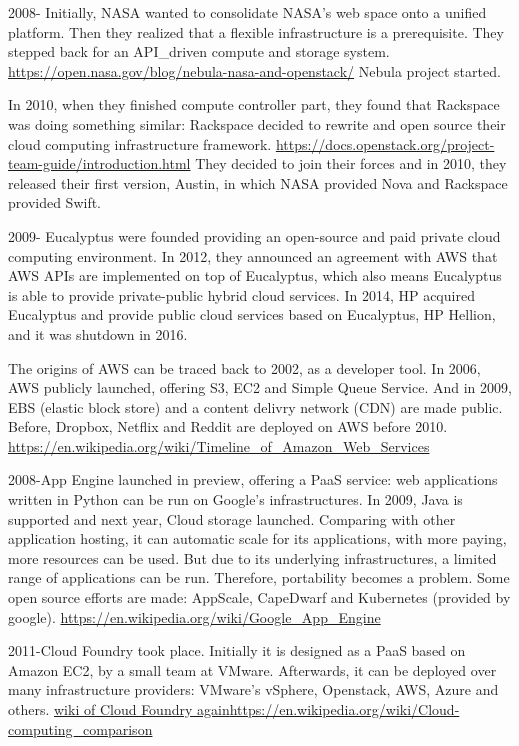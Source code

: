 \documentclass[a4paper,12pt]{article}
\begin{document}
2008- Initially, NASA wanted to consolidate NASA’s web space onto a unified platform. Then they realized that a flexible infrastructure is a prerequisite. They stepped back for an API\_driven compute and storage system. \url{https://open.nasa.gov/blog/nebula-nasa-and-openstack/} Nebula project started. 

In 2010, when they finished compute controller part, they found that Rackspace was doing something similar: Rackspace decided to rewrite and open source their cloud computing infrastructure framework. \url{https://docs.openstack.org/project-team-guide/introduction.html} They decided to join their forces and in 2010, they released their first version, Austin, in which NASA provided Nova and Rackspace provided Swift. 

2009- Eucalyptus were founded providing an open-source and paid private cloud computing environment. In 2012, they announced an agreement with AWS that AWS APIs are implemented on top of Eucalyptus, which also means Eucalyptus is able to provide private-public hybrid cloud services. In 2014, HP acquired Eucalyptus and provide public cloud services based on Eucalyptus, HP Hellion, and it was shutdown in 2016. 

The origins of AWS can be traced back to 2002, as a developer tool. In 2006, AWS publicly launched, offering S3, EC2 and Simple Queue Service. And in 2009, EBS (elastic block store) and a content delivry network (CDN) are made public. Before, Dropbox, Netflix and Reddit are deployed on AWS before 2010. \url{https://en.wikipedia.org/wiki/Timeline_of_Amazon_Web_Services}

2008-App Engine launched in preview, offering a PaaS service: web applications written in Python can be run on Google's infrastructures. In 2009, Java is supported and next year, Cloud storage launched. Comparing with other application hosting, it can automatic scale for its applications, with more paying, more resources can be used. But due to its underlying infrastructures, a limited range of applications can be run. Therefore, portability becomes a problem. Some open source efforts are made: AppScale, CapeDwarf and Kubernetes (provided by google). \url{https://en.wikipedia.org/wiki/Google_App_Engine}

2011-Cloud Foundry took place. Initially it is designed as a PaaS based on Amazon EC2, by a small team at VMware. Afterwards, it can be deployed over many infrastructure providers: VMware's vSphere, Openstack, AWS, Azure and others. \url{wiki of Cloud Foundry again}\url{https://en.wikipedia.org/wiki/Cloud-computing_comparison}
\end{document}
